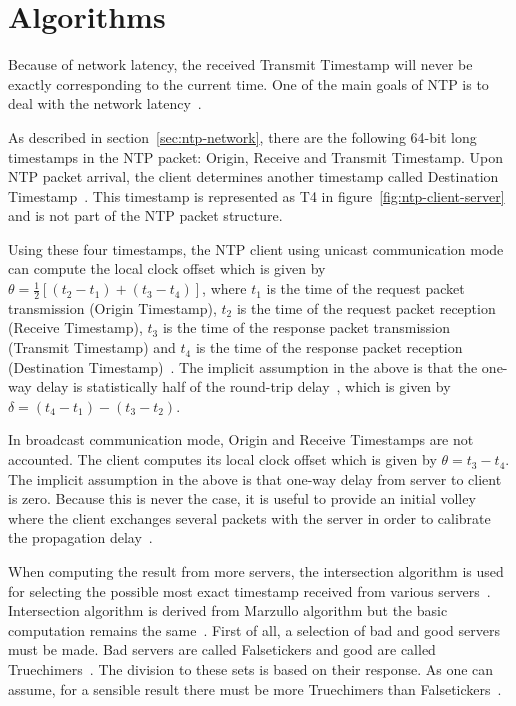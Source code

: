 
\section{Algorithms}\label{sec:ntp-algorithms}
Because of network latency, the received Transmit Timestamp will never be exactly
corresponding to the current time.
One of the main goals of NTP is to deal with the network latency~\cite{ntp-overview}.

As described in section~\ref{sec:ntp-network},
there are the following 64-bit long timestamps in the NTP packet: Origin, Receive and Transmit Timestamp.
Upon NTP packet arrival, the client determines another timestamp called
Destination Timestamp~\cite{rfc5905}.
This timestamp is represented as T4 in figure~\ref{fig:ntp-client-server}
and is not part of the NTP packet structure.

Using these four timestamps, the NTP client using unicast communication mode can compute
the local clock offset which is given by $\theta = \frac{1}{2}[(t_2 - t_1) + (t_3 - t_4)]$,
where $t_1$ is the time of the request packet transmission (Origin Timestamp),
$t_2$ is the time of the request packet reception (Receive Timestamp),
$t_3$ is the time of the response packet transmission (Transmit Timestamp) and
$t_4$ is the time of the response packet reception (Destination Timestamp)~\cite{ntp-algor,rfc5905}.
The implicit assumption in the above is that the one-way delay is
statistically half of the round-trip delay~\cite{rfc5905},
which is given by $\delta = (t_4 - t_1) - (t_3 - t_2)$.

In broadcast communication mode, Origin and Receive Timestamps are not accounted.
The client computes its local clock offset which is given by $\theta = t_3 - t_4$.
The implicit assumption in the above is that one-way delay from server to client is zero.
Because this is never the case, it is useful to provide an
initial volley where the client exchanges several packets with the server in
order to calibrate the propagation delay~\cite{rfc5905}.

When computing the result from more servers, the intersection algorithm is used
for selecting the possible most exact timestamp received from various servers~\cite{ntp-improved-algor,rfc5905}.
Intersection algorithm is derived from Marzullo algorithm but the basic
computation remains the same~\cite{ntp-history}.
First of all, a selection of bad and good servers must be made.
Bad servers are called Falsetickers and good are called Truechimers~\cite{rfc5905}.
The division to these sets is based on their response.
As one can assume, for a sensible result there must be more Truechimers than Falsetickers~\cite{rfc5905}.

